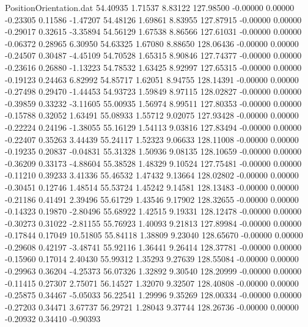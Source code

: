 \begin{filecontents}{PositionOrientation.dat}
  54.40935    1.71537    8.83122   127.98500   -0.00000    0.00000   -0.23305    0.11586   -1.47207
  54.48126    1.69861    8.83955   127.87915   -0.00000    0.00000   -0.29017    0.32615   -3.35894
  54.56129    1.67538    8.86566   127.61031   -0.00000    0.00000   -0.06372    0.28965    6.30950
  54.63325    1.67080    8.88650   128.06436   -0.00000    0.00000   -0.24507    0.30487   -4.45109
  54.70528    1.65315    8.90846   127.74377   -0.00000    0.00000   -0.23616    0.26880   -1.13223
  54.78532    1.63425    8.92997   127.65315   -0.00000    0.00000   -0.19123    0.24463    6.82992
  54.85717    1.62051    8.94755   128.14391   -0.00000    0.00000   -0.27498    0.29470   -1.44453
  54.93723    1.59849    8.97115   128.02827   -0.00000    0.00000   -0.39859    0.33232   -3.11605
  55.00935    1.56974    8.99511   127.80353   -0.00000    0.00000   -0.15788    0.32052    1.63491
  55.08933    1.55712    9.02075   127.93428   -0.00000    0.00000   -0.22224    0.24196   -1.38055
  55.16129    1.54113    9.03816   127.83494   -0.00000    0.00000   -0.22407    0.35263    3.44439
  55.24117    1.52323    9.06633   128.11008   -0.00000    0.00000   -0.19235    0.20837   -0.04831
  55.31328    1.50936    9.08135   128.10659   -0.00000    0.00000   -0.36209    0.33173   -4.88604
  55.38528    1.48329    9.10524   127.75481   -0.00000    0.00000   -0.11210    0.39233    3.41336
  55.46532    1.47432    9.13664   128.02802   -0.00000    0.00000   -0.30451    0.12746    1.48514
  55.53724    1.45242    9.14581   128.13483   -0.00000    0.00000   -0.21186    0.41491    2.39496
  55.61729    1.43546    9.17902   128.32655   -0.00000    0.00000   -0.14323    0.19870   -2.80496
  55.68922    1.42515    9.19331   128.12478   -0.00000    0.00000   -0.30273    0.31022   -2.81155
  55.76923    1.40093    9.21813   127.89984   -0.00000    0.00000   -0.17844    0.17049   10.51805
  55.84118    1.38809    9.23040   128.65670   -0.00000    0.00000   -0.29608    0.42197   -3.48741
  55.92116    1.36441    9.26414   128.37781   -0.00000    0.00000   -0.15960    0.17014    2.40430
  55.99312    1.35293    9.27639   128.55084   -0.00000    0.00000   -0.29963    0.36204   -4.25373
  56.07326    1.32892    9.30540   128.20999   -0.00000    0.00000   -0.11415    0.27307    2.75071
  56.14527    1.32070    9.32507   128.40808   -0.00000    0.00000   -0.25875    0.34467   -5.05033
  56.22541    1.29996    9.35269   128.00334   -0.00000    0.00000   -0.27203    0.34471    3.67737
  56.29721    1.28043    9.37744   128.26736   -0.00000    0.00000   -0.20932    0.34410   -0.90393

\end{filecontents}
